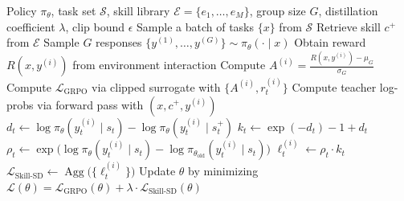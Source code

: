 \begin{algorithm}[t]
  \caption{Skill-SD}
  \label{alg:skillsd}
  \begin{algorithmic}[1]
  \Require Policy $\pi_{\theta}$, task set $\mathcal{S}$, skill library $\mathcal{E} =
  \{e_1,\dots,e_M\}$, group size $G$, distillation coefficient $\lambda$, clip
  bound $\epsilon$
      \State Sample a batch of tasks $\{x\}$ from $\mathcal{S}$
          \State Retrieve skill $c^{+}$ from $\mathcal{E}$ 
          \State {}
          \State Sample $G$ responses $\{y^{(1)},\dots,y^{(G)}\} \sim \pi_{\theta}(\cdot \mid
  x)$
          \State {}
              \State Obtain reward $R(x, y^{(i)})$ from environment interaction
          \EndFor
          \State Compute $A^{(i)} = \frac{R(x,y^{(i)}) - \mu_G}{\sigma_G}$
          \State {}
          \State Compute $\mathcal{L}_{\mathrm{GRPO}}$ via clipped surrogate with $\{A^{(i)},
  r_t^{(i)}\}$
          \State {}
              \State Compute teacher log-probs via forward pass with $(x, c^{+}, y^{(i)})$
                  \State $d_t \gets \log\pi_{\theta}(y_t^{(i)} \mid s_t) -
  \log\pi_{\theta}(y_t^{(i)} \mid s_t^{+})$
                  \State $k_t \gets \exp(-d_t) - 1 + d_t$
                  \State $\rho_t \gets \exp\!\bigl(\log\pi_{\theta}(y_t^{(i)} \mid s_t) -
  \log\pi_{\theta_{\mathrm{old}}}(y_t^{(i)} \mid s_t)\bigr)$
                  \State $\ell_t^{(i)} \gets \rho_t \cdot k_t$
              \EndFor
          \EndFor
          \State $\mathcal{L}_{\text{Skill-SD}} \gets
  \operatorname{Agg}\!\bigl(\{\ell_t^{(i)}\}\bigr)$
          \State {}
          \State Update $\theta$ by minimizing $\mathcal{L}(\theta) =
  \mathcal{L}_{\mathrm{GRPO}}(\theta) + \lambda \cdot \mathcal{L}_{\text{Skill-SD}}(\theta)$
      \EndFor
  \EndFor
  \end{algorithmic}
\end{algorithm}

